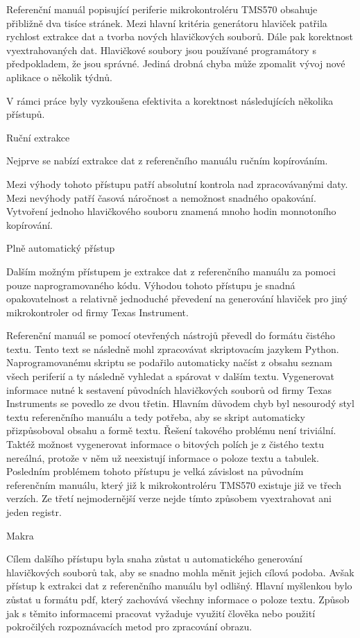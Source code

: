 Referenční manuál popisující periferie mikrokontroléru TMS570 obsahuje přibližně dva tisíce stránek. Mezi hlavní kritéria generátoru hlaviček patřila rychlost extrakce dat a tvorba nových hlavičkových souborů. Dále pak korektnost vyextrahovaných dat. Hlavičkové soubory jsou používané programátory s předpokladem, že jsou správné. Jediná drobná chyba může zpomalit vývoj nové aplikace o několik týdnů.

V rámci práce byly vyzkoušena efektivita a korektnost následujících několika přístupů.

\secc Ruční extrakce

	Nejprve se nabízí extrakce dat z referenčního manuálu ručním kopírováním.

Mezi výhody tohoto přístupu patří absolutní kontrola nad zpracovávanými daty. Mezi nevýhody patří časová náročnost a nemožnost snadného opakování. Vytvoření jednoho hlavičkového souboru znamená mnoho hodin monnotoního kopírování.

\secc Plně automatický přístup

	Dalším možným přístupem je extrakce dat z referenčního manuálu za pomoci pouze naprogramovaného kódu. Výhodou tohoto přístupu je snadná opakovatelnost a relativně jednoduché převedení na generování hlaviček pro jiný mikrokontroler od firmy Texas Instrument.

Referenční manuál se pomocí otevřených nástrojů převedl do formátu čistého textu. Tento text se následně mohl zpracovávat skriptovacím jazykem Python. Naprogramovanému skriptu se podařilo automaticky načíst z obsahu seznam všech periferií a ty následně vyhledat a spárovat v dalším textu. Vygenerovat informace nutné k sestavení původních hlavičkových souborů od firmy Texas Instruments se povedlo ze dvou třetin. Hlavním důvodem chyb byl nesourodý styl textu referenčního manuálu a tedy potřeba, aby se skript automaticky přizpůsoboval obsahu a formě textu. Řešení takového problému není triviální. Taktéž možnost vygenerovat informace o bitových polích je z čistého textu nereálná, protože v něm už neexistují informace o poloze textu a tabulek. Posledním problémem tohoto přístupu je velká závislost na původním referenčním manuálu, který již k mikrokontroléru TMS570 existuje již ve třech verzích. Ze třetí nejmodernější verze nejde tímto způsobem vyextrahovat ani jeden registr.

\secc Makra

	Cílem dalšího přístupu byla snaha zůstat u automatického generování hlavičkových souborů tak, aby se snadno mohla měnit jejich cílová podoba. Avšak přístup k extrakci dat z referenčního manuálu byl odlišný. Hlavní myšlenkou bylo zůstat u formátu pdf, který zachovává všechny informace o poloze textu. Způsob jak s těmito informacemi pracovat vyžaduje využití člověka nebo použití pokročilých rozpoznávacích metod pro zpracování obrazu.

